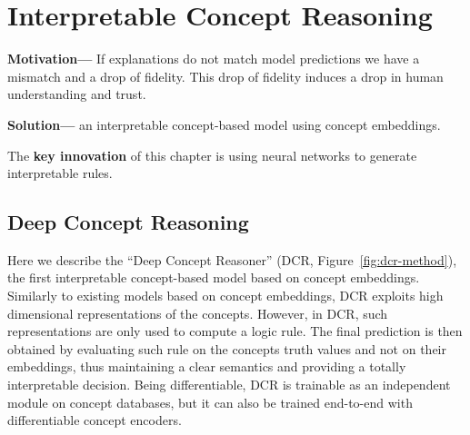\chapter{Interpretable Concept Reasoning}
\label{chapter:DCR}

\textbf{Motivation---} If explanations do not match model predictions we have a mismatch and a drop of fidelity. This drop of fidelity induces a drop in human understanding and trust.

\textbf{Solution---} an interpretable concept-based model using concept embeddings.

The \textbf{key innovation} of this chapter is using neural networks to generate interpretable rules.

\section{Deep Concept Reasoning}
Here we describe the ``Deep Concept Reasoner'' (DCR, Figure~\ref{fig:dcr-method}), the first interpretable concept-based model based on concept embeddings.  Similarly to existing models based on concept embeddings, DCR exploits high dimensional representations of the concepts. However, in DCR, such representations are only used to compute a logic rule. The final prediction is then obtained by evaluating such rule on the concepts truth values and not on their embeddings, thus maintaining a clear semantics and providing a totally interpretable decision. 
Being differentiable, DCR is trainable as an independent module on concept databases, but it can also be trained end-to-end with differentiable concept encoders.
